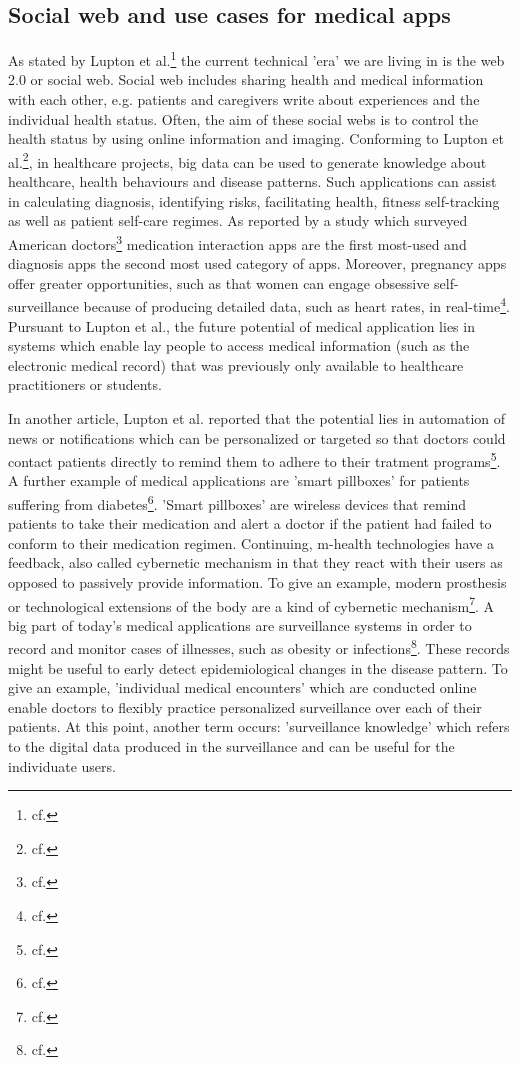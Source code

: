 \subsection{Social web and use cases for medical apps}
As stated by Lupton et al.\footnote{cf.\autocite{lupton_apps}} the current technical 'era' we are living in is the web 2.0 or social web. Social web includes sharing health and medical information with each other, e.g. patients and caregivers write about experiences and the individual health status. Often, the aim of these social webs is to control the health status by using online information and imaging.
Conforming to Lupton et al.\footnote{cf.\autocite{lupton_apps}}, in healthcare projects, big data can be used to generate knowledge about healthcare, health behaviours and disease patterns. Such applications can assist in calculating diagnosis, identifying risks, facilitating health, fitness self-tracking as well as patient self-care regimes.
As reported by a study which surveyed American doctors\footnote{cf.\autocite{lupton_apps}} medication interaction apps are the first most-used and diagnosis apps the second most used category of apps.
Moreover, pregnancy apps offer greater opportunities, such as that women can engage obsessive self-surveillance because of producing detailed data, such as heart rates, in real-time\footnote{cf.\autocite{lupton_apps}}. Pursuant to Lupton et al., the future potential of medical application lies in systems which enable lay people to access medical information (such as the electronic medical record) that was previously only available to healthcare practitioners or students.

In another article, Lupton et al. reported that the potential lies in automation of news or notifications which can be personalized or targeted so that doctors could contact patients directly to remind them to adhere to their tratment programs\footnote{cf.\autocite{lupton_mhealth}}.
A further example of medical applications are 'smart pillboxes' for patients suffering from diabetes\footnote{cf.\autocite{lupton_mhealth}}. 'Smart pillboxes' are wireless devices that remind patients to take their medication and alert a doctor if the patient had failed to conform to their medication regimen.
Continuing, \ac{m-health} technologies have a feedback, also called cybernetic mechanism in that they react with their users as opposed to passively provide information. To give an example, modern prosthesis or technological extensions of the body are a kind of cybernetic mechanism\footnote{cf.\autocite{lupton_mhealth}}. 
A big part of today's medical applications are surveillance systems in order to record and monitor cases of illnesses, such as obesity or infections\footnote{cf.\autocite{lupton_mhealth}}. These records might be useful to early detect epidemiological changes in the disease pattern. To give an example, 'individual medical encounters' which are conducted online enable doctors to flexibly practice personalized surveillance over each of their patients. At this point, another term occurs: 'surveillance knowledge' which refers to the digital data produced in the surveillance and can be useful for the individuate users.

